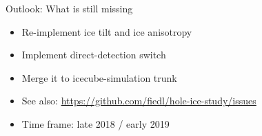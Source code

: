 
\begin{frame}{Outlook: What is still missing}
  \begin{itemize}
    \item Re-implement ice tilt and ice anisotropy
    \item Implement direct-detection switch
    \item Merge it to icecube-simulation trunk
    \item See also: \url{https://github.com/fiedl/hole-ice-study/issues}
  \end{itemize}

  \bigskip
  \begin{itemize}
    \item Time frame: late 2018 / early 2019
  \end{itemize}
\end{frame}
